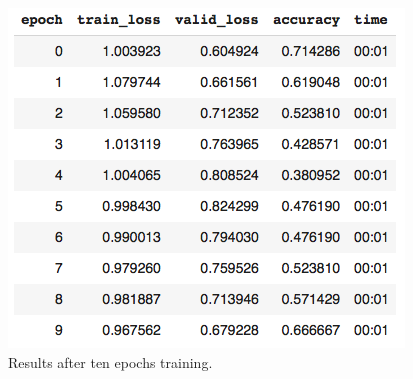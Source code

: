 \begin{figure}[h]
    \centering
    \includegraphics[scale=0.6]{figures/classification_results.png}
    \caption{Results after ten epochs training.}
    \label{fig:classification_results}
\end{figure}